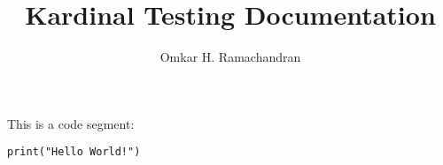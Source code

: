 \documentclass[english]{article}
\begin{document}
\title{Kardinal Testing Documentation}
\author{Omkar H. Ramachandran}
\date{}
\maketitle

This is a code segment:
\begin{lstlisting}
print("Hello World!")
\end{lstlisting}
\end{document}

